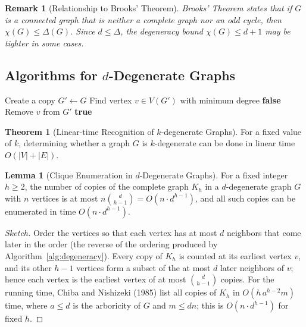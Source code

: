 \documentclass{article}
\newtheorem{remark}{Remark}
\theoremstyle{definition}
\newtheorem{theorem}{Theorem}
\newtheorem{lemma}{Lemma}
\begin{document}
\begin{remark}[Relationship to Brooks' Theorem]
Brooks' Theorem states that if $G$ is a connected graph that is neither a complete graph nor an odd cycle, then $\chi(G) \leq \Delta(G)$. Since $d \leq \Delta$, the degeneracy bound $\chi(G) \leq d+1$ may be tighter in some cases.
\end{remark}

\subsection{Algorithms for $d$-Degenerate Graphs}

\begin{algorithm}
\caption{Recognition of $k$-Degenerate Graphs}
\label{alg:k-degen-recognition}
\begin{algorithmic}[1]
        \State Create a copy $G' \gets G$
            \State Find vertex $v \in V(G')$ with minimum degree
                \State \Return \textbf{false} 
            \EndIf
            \State Remove $v$ from $G'$
        \EndWhile
        \State \Return \textbf{true} 
    \EndProcedure
\end{algorithmic}
\end{algorithm}

\begin{theorem}[Linear-time Recognition of $k$-degenerate Graphs]
For a fixed value of $k$, determining whether a graph $G$ is $k$-degenerate can be done in linear time $O(|V| + |E|)$.
\end{theorem}

\begin{lemma}[Clique Enumeration in $d$-Degenerate Graphs]
For a fixed integer $h \geq 2$, the number of copies of the complete graph $K_h$ in a $d$-degenerate graph $G$ with $n$ vertices is at most $n\binom{d}{h-1} = O(n \cdot d^{h-1})$, and all such copies can be enumerated in time $O(n \cdot d^{h-1})$.
\end{lemma}

\begin{proof}[Sketch]
Order the vertices so that each vertex has at most $d$ neighbors that come later in the order (the reverse of the ordering produced by Algorithm~\ref{alg:degeneracy}). Every copy of $K_h$ is counted at its earliest vertex $v$, and its other $h-1$ vertices form a subset of the at most $d$ later neighbors of $v$; hence each vertex is the earliest vertex of at most $\binom{d}{h-1}$ copies. For the running time, Chiba and Nishizeki (1985) list all copies of $K_h$ in $O(h\, a^{h-2} m)$ time, where $a \leq d$ is the arboricity of $G$ and $m \leq dn$; this is $O(n \cdot d^{h-1})$ for fixed $h$.
\end{proof}
\end{document}
